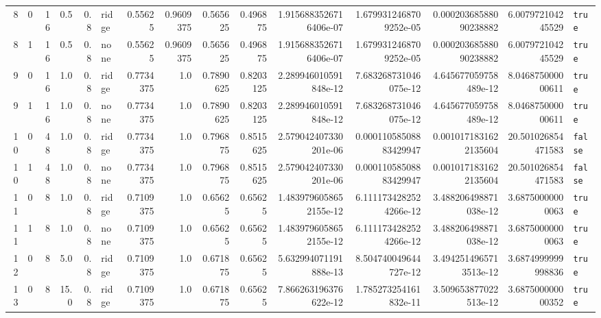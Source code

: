 \documentclass[11pt,a4paper]{article}
\begin{document}
\begin{landscape}
\begin{longtable}{r r r r r l r r r r r r r r l}
8 & 0 & 16 & 0.5 & 0.8 & ridge & 0.55625 & 0.9609375 & 0.565625 & 0.496875 & 1.9156883526716406e-07 & 1.6799312468709252e-05 & 0.00020368588090238882 & 6.007972104245529 & \texttt{true} \\
8 & 1 & 16 & 0.5 & 0.8 & none & 0.55625 & 0.9609375 & 0.565625 & 0.496875 & 1.9156883526716406e-07 & 1.6799312468709252e-05 & 0.00020368588090238882 & 6.007972104245529 & \texttt{true} \\
9 & 0 & 16 & 1.0 & 0.8 & ridge & 0.7734375 & 1.0 & 0.7890625 & 0.8203125 & 2.289946010591848e-12 & 7.683268731046075e-12 & 4.645677059758489e-12 & 8.046875000000611 & \texttt{true} \\
9 & 1 & 16 & 1.0 & 0.8 & none & 0.7734375 & 1.0 & 0.7890625 & 0.8203125 & 2.289946010591848e-12 & 7.683268731046075e-12 & 4.645677059758489e-12 & 8.046875000000611 & \texttt{true} \\
10 & 0 & 48 & 1.0 & 0.8 & ridge & 0.7734375 & 1.0 & 0.796875 & 0.8515625 & 2.579042407330201e-06 & 0.00011058508883429947 & 0.0010171831622135604 & 20.501026854471583 & \texttt{false} \\
10 & 1 & 48 & 1.0 & 0.8 & none & 0.7734375 & 1.0 & 0.796875 & 0.8515625 & 2.579042407330201e-06 & 0.00011058508883429947 & 0.0010171831622135604 & 20.501026854471583 & \texttt{false} \\
11 & 0 & 8 & 1.0 & 0.8 & ridge & 0.7109375 & 1.0 & 0.65625 & 0.65625 & 1.4839796058652155e-12 & 6.1111734282524266e-12 & 3.488206498871038e-12 & 3.68750000000063 & \texttt{true} \\
11 & 1 & 8 & 1.0 & 0.8 & none & 0.7109375 & 1.0 & 0.65625 & 0.65625 & 1.4839796058652155e-12 & 6.1111734282524266e-12 & 3.488206498871038e-12 & 3.68750000000063 & \texttt{true} \\
12 & 0 & 8 & 5.0 & 0.8 & ridge & 0.7109375 & 1.0 & 0.671875 & 0.65625 & 5.632994071191888e-13 & 8.504740049644727e-12 & 3.4942514965713513e-12 & 3.6874999999998836 & \texttt{true} \\
13 & 0 & 8 & 15.0 & 0.8 & ridge & 0.7109375 & 1.0 & 0.671875 & 0.65625 & 7.866263196376622e-12 & 1.785273254161832e-11 & 3.509653877022513e-12 & 3.687500000000352 & \texttt{true} \\
\end{longtable}
\end{landscape}



\end{document}
